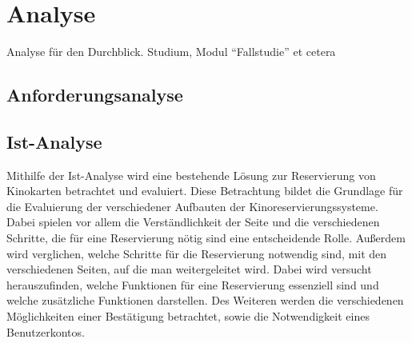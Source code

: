 \chapter{Analyse} \label{analyse}
	
	Analyse für den Durchblick.
	Studium, Modul \enquote{Fallstudie} et cetera
	
	\section{Anforderungsanalyse}
	
	\section{Ist-Analyse}
	Mithilfe der Ist-Analyse wird eine bestehende Lösung zur Reservierung von Kinokarten betrachtet und evaluiert. Diese Betrachtung bildet die Grundlage für die Evaluierung der verschiedener Aufbauten der Kinoreservierungssysteme. Dabei spielen vor allem die Verständlichkeit der Seite und die verschiedenen Schritte, die für eine Reservierung nötig sind eine entscheidende Rolle. Außerdem wird verglichen, welche Schritte für die Reservierung notwendig sind, mit den verschiedenen Seiten, auf die man weitergeleitet wird. Dabei wird versucht herauszufinden, welche Funktionen für eine Reservierung essenziell sind und welche zusätzliche Funktionen darstellen. Des Weiteren werden die verschiedenen Möglichkeiten einer Bestätigung betrachtet, sowie die Notwendigkeit eines Benutzerkontos. 
	
